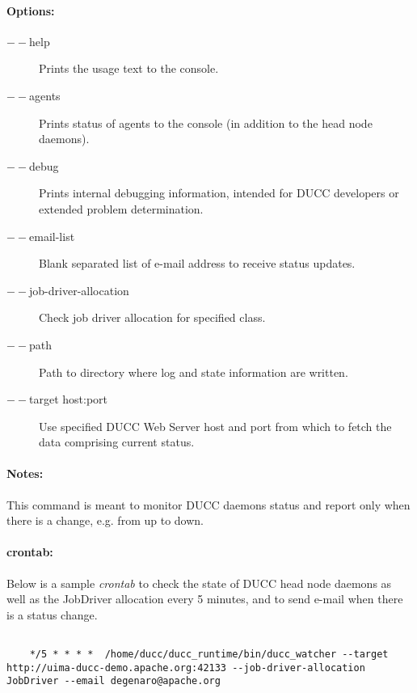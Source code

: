   \paragraph{Options:}
    \begin{description}
    	\item[$--$help]
          Prints the usage text to the console. 
        \item[$--$agents]
          Prints status of agents to the console (in addition to the head node daemons). 
        \item[$--$debug]          
          Prints internal debugging information, intended for DUCC developers or extended problem determination.      
        \item[$--$email-list]          
          Blank separated list of e-mail address to receive status updates.  
        \item[$--$job-driver-allocation]          
          Check job driver allocation for specified class.     
        \item[$--$path]          
          Path to directory where log and state information are written.  
        \item[$--$target host:port]          
          Use specified DUCC Web Server host and port from which to fetch the data comprising current status.                                                                                               
     \end{description}
            
  \paragraph{Notes:}
    This command is meant to monitor DUCC daemons status and report only when there is a change, e.g. from up to down.
  
  \paragraph{crontab:}
  
    Below is a sample {\em crontab} to check the state of DUCC head node daemons as well as
    the JobDriver allocation every 5 minutes, and to send e-mail when there is a status change.
    
    \begin{verbatim}
    
    */5 * * * *  /home/ducc/ducc_runtime/bin/ducc_watcher --target http://uima-ducc-demo.apache.org:42133 --job-driver-allocation JobDriver --email degenaro@apache.org
    
    \end{verbatim}